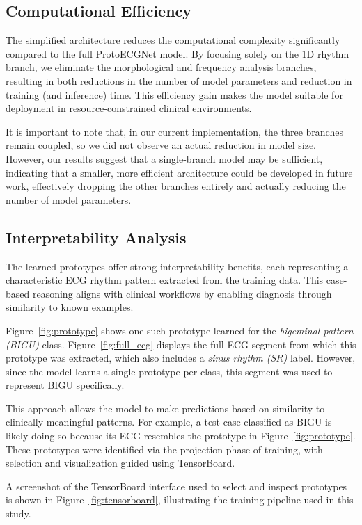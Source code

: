 \subsection{Computational Efficiency}

The simplified architecture reduces the computational complexity significantly compared to the full ProtoECGNet model. By focusing solely on the 1D rhythm branch, we eliminate the morphological and frequency analysis branches, resulting in both reductions in the number of model parameters and reduction in training (and inference) time. This efficiency gain makes the model suitable for deployment in resource-constrained clinical environments.

It is important to note that, in our current implementation, the three branches remain coupled, so we did not observe an actual reduction in model size. However, our results suggest that a single-branch model may be sufficient, indicating that a smaller, more efficient architecture could be developed in future work, effectively dropping the other branches entirely and actually reducing the number of model parameters.

\subsection{Interpretability Analysis}

The learned prototypes offer strong interpretability benefits, each representing a characteristic ECG rhythm pattern extracted from the training data. This case-based reasoning aligns with clinical workflows by enabling diagnosis through similarity to known examples.

Figure~\ref{fig:prototype} shows one such prototype learned for the \textit{bigeminal pattern (BIGU)} class. Figure~\ref{fig:full_ecg} displays the full ECG segment from which this prototype was extracted, which also includes a \textit{sinus rhythm (SR)} label. However, since the model learns a single prototype per class, this segment was used to represent BIGU specifically.

This approach allows the model to make predictions based on similarity to clinically meaningful patterns. For example, a test case classified as BIGU is likely doing so because its ECG resembles the prototype in Figure~\ref{fig:prototype}. These prototypes were identified via the projection phase of training, with selection and visualization guided using TensorBoard.

A screenshot of the TensorBoard interface used to select and inspect prototypes is shown in Figure~\ref{fig:tensorboard}, illustrating the training pipeline used in this study.

